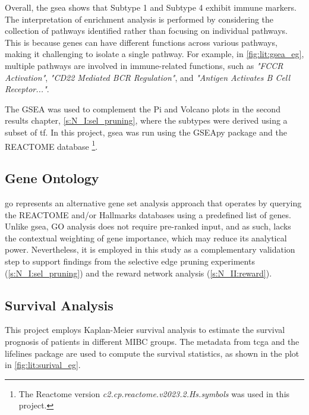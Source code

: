 Overall, the \acrshort{gsea} shows that Subtype 1 and Subtype 4 exhibit immune markers. The interpretation of enrichment analysis is performed by considering the collection of pathways identified rather than focusing on individual pathways. This is because genes can have different functions across various pathways, making it challenging to isolate a single pathway. For example, in \cref{fig:lit:gsea_eg}, multiple pathways are involved in immune-related functions, such as \textit{"FCCR Activation"}, \textit{"CD22 Mediated BCR Regulation"}, and \textit{"Antigen Activates B Cell Receptor..."}. 

The GSEA was used to complement the Pi and Volcano plots in the second results chapter, \cref{s:N_I:sel_pruning}, where the subtypes were derived using a subset of \acrlong{tf}. In this project, \acrfull{gsea} was run using the GSEApy package \citep{Fang2023-ec} and the REACTOME database \cite{Milacic2024-yt}\footnote{The Reactome version \textit{c2.cp.reactome.v2023.2.Hs.symbols} was used in this project.}.

\subsection{Gene Ontology} \label{s:lit:go}

\acrfull{go} represents an alternative gene set analysis approach that operates by querying the REACTOME and/or Hallmarks databases using a predefined list of genes. Unlike \acrshort{gsea}, GO analysis does not require pre-ranked input, and as such, lacks the contextual weighting of gene importance, which may reduce its analytical power. Nevertheless, it is employed in this study as a complementary validation step to support findings from the selective edge pruning experiments (\cref{s:N_I:sel_pruning}) and the reward network analysis (\cref{s:N_II:reward}).


\subsection{Survival Analysis} \label{s:lit:survival}

This project employs Kaplan-Meier survival analysis \cite{Kaplan1958-iy} to estimate the survival prognosis of patients in different MIBC groups. The metadata from \acrlong{tcga} and the lifelines package \citep{Davidson-Pilon2019-fu} are used to compute the survival statistics, as shown in the plot in \cref{fig:lit:surival_eg}.

